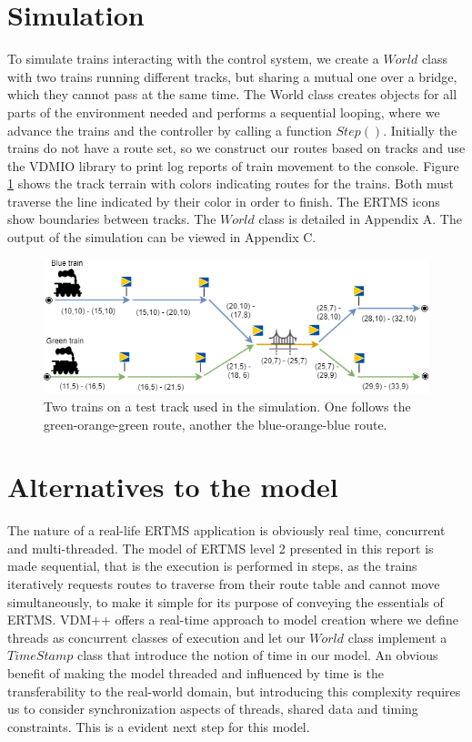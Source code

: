 \documentclass[preprint,12pt]{elsarticle}
\begin{document}
\section{Simulation}

To simulate trains interacting with the control system, we create a $World$ class with two trains running different tracks, but sharing a mutual one over a bridge, which they cannot pass at the same time. The World class creates objects for all parts of the environment needed and performs a sequential looping, where we advance the trains and the controller by calling a function $Step()$. Initially the trains do not have a route set, so we construct our routes based on tracks and use the VDMIO library to print log reports of train movement to the console. Figure \ref{fig:testtrack} shows the track terrain with colors indicating routes for the trains. Both must traverse the line indicated by their color in order to finish. The ERTMS icons show boundaries between tracks. The $World$ class is detailed in Appendix A. The output of the simulation can be viewed in Appendix C.

\begin{figure}[h]
	\centering
	\includegraphics[width=0.8\linewidth]{TrainTrack.png}
	\caption{Two trains on a test track used in the simulation. One follows the green-orange-green route, another the blue-orange-blue route.}
	\label{fig:testtrack}
\end{figure}

\section{Alternatives to the model}

The nature of a real-life ERTMS application is obviously real time, concurrent and multi-threaded. The model of ERTMS level 2 presented in this report is made sequential, that is the execution is performed in steps, as the trains iteratively requests routes to traverse from their route table and cannot move simultaneously, to make it simple for its purpose of conveying the essentials of ERTMS. VDM++ offers a real-time approach to model creation where we define threads as concurrent classes of execution and let our $World$ class implement a $TimeStamp$ class that introduce the notion of time in our model. An obvious benefit of making the model threaded and influenced by time is the transferability to the real-world domain, but introducing this complexity requires us to consider synchronization aspects of threads, shared data and timing constraints. This is a evident next step for this model.
\end{document}
